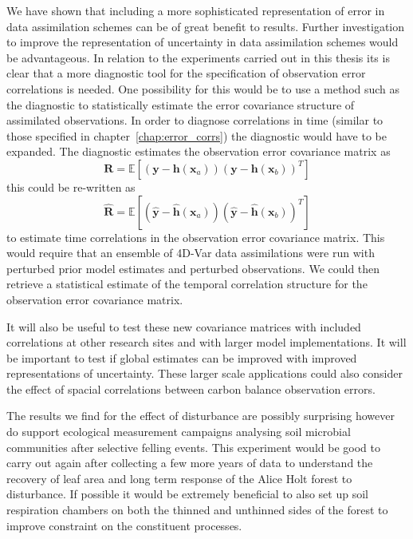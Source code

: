 We have shown that including a more sophisticated representation of error in data assimilation schemes can be of great benefit to results. Further investigation to improve the representation of uncertainty in data assimilation schemes would be advantageous. In relation to the experiments carried out in this thesis its is clear that a more diagnostic tool for the specification of observation error correlations is needed. One possibility for this would be to use a method such as the \citet{desroziers2005diagnosis} diagnostic to statistically estimate the error covariance structure of assimilated observations. In order to diagnose correlations in time (similar to those specified in chapter~\ref{chap:error_corrs}) the \citet{desroziers2005diagnosis} diagnostic would have to be expanded. The \citet{desroziers2005diagnosis} diagnostic estimates the observation error covariance matrix as
\begin{equation}
\textbf{R} = \mathbb{E}[(\textbf{y}-\textbf{h}(\textbf{x}_a))(\textbf{y}-\textbf{h}(\textbf{x}_b))^{T}]
\end{equation}
this could be re-written as
\begin{equation}
\hat{\textbf{R}} = \mathbb{E}[(\hat{\textbf{y}}-\hat{\textbf{h}}(\textbf{x}_a))(\hat{\textbf{y}}-\hat{\textbf{h}}(\textbf{x}_b))^{T}]
\end{equation}
to estimate time correlations in the observation error covariance matrix. This would require that an ensemble of 4D-Var data assimilations were run with perturbed prior model estimates and perturbed observations. We could then retrieve a statistical estimate of the temporal correlation structure for the observation error covariance matrix. 

It will also be useful to test these new covariance matrices with included correlations at other research sites and with larger model implementations. It will be important to test if global estimates can be improved with improved representations of uncertainty. These larger scale applications could also consider the effect of spacial correlations between carbon balance observation errors.

The results we find for the effect of disturbance are possibly surprising however do support ecological measurement campaigns analysing soil microbial communities after selective felling events. This experiment would be good to carry out again after collecting a few more years of data to understand the recovery of leaf area and long term response of the Alice Holt forest to disturbance. If possible it would be extremely beneficial to also set up soil respiration chambers on both the thinned and unthinned sides of the forest to improve constraint on the constituent processes.